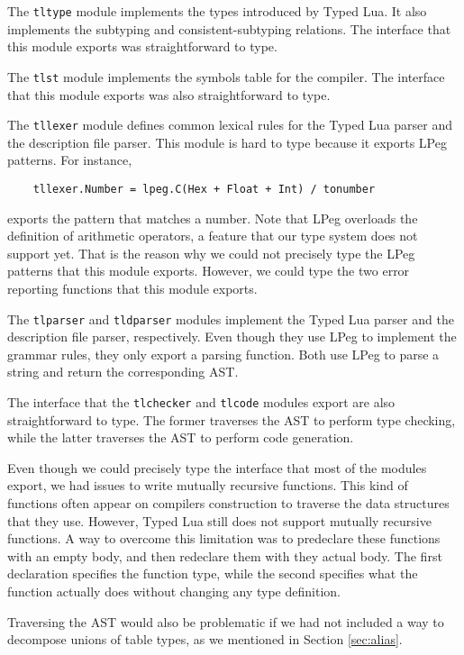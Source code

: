 The \texttt{tltype} module implements the types introduced by Typed Lua.
It also implements the subtyping and consistent-subtyping relations.
The interface that this module exports was straightforward to type.

The \texttt{tlst} module implements the symbols table for the compiler.
The interface that this module exports was also straightforward to type.

The \texttt{tllexer} module defines common lexical rules for
the Typed Lua parser and the description file parser.
This module is hard to type because it exports LPeg \citep{lpeg,ierusalimschy2009lpeg}
patterns.
For instance,
\begin{verbatim}
    tllexer.Number = lpeg.C(Hex + Float + Int) / tonumber
\end{verbatim}
exports the pattern that matches a number.
Note that LPeg overloads the definition of arithmetic operators,
a feature that our type system does not support yet.
That is the reason why we could not precisely type the LPeg
patterns that this module exports.
However, we could type the two error reporting functions that this
module exports.

The \texttt{tlparser} and \texttt{tldparser} modules implement the Typed Lua
parser and the description file parser, respectively.
Even though they use LPeg to implement the grammar rules,
they only export a parsing function.
Both use LPeg to parse a string and return the corresponding AST.

The interface that the \texttt{tlchecker} and \texttt{tlcode}
modules export are also straightforward to type.
The former traverses the AST to perform type checking,
while the latter traverses the AST to perform code generation.

Even though we could precisely type the interface that most of
the modules export, we had issues to write mutually recursive functions.
This kind of functions often appear on compilers construction
to traverse the data structures that they use.
However, Typed Lua still does not support mutually recursive functions.
A way to overcome this limitation was to predeclare these functions
with an empty body, and then redeclare them with they actual body.
The first declaration specifies the function type, while the
second specifies what the function actually does without changing
any type definition.

Traversing the AST would also be problematic if we had not included
a way to decompose unions of table types, as we mentioned in Section \ref{sec:alias}.

